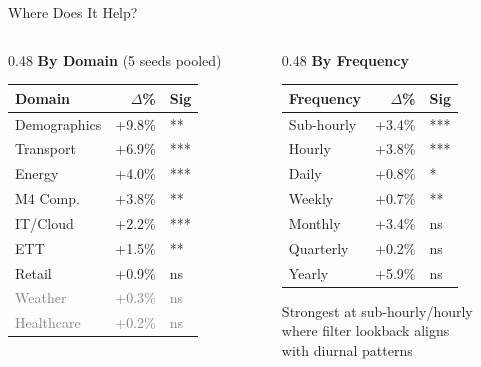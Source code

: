\documentclass[aspectratio=169,11pt]{beamer}
\begin{document}
\begin{frame}{Where Does It Help?}

\begin{columns}
\begin{column}{0.48\textwidth}
\centering
\textbf{By Domain} {\footnotesize(5 seeds pooled)}\\[0.3em]
\footnotesize
\begin{tabular}{lrl}
\toprule
Domain & $\Delta$\% & Sig \\
\midrule
Demographics & +9.8\% & ** \\
Transport & +6.9\% & *** \\
Energy & +4.0\% & *** \\
M4 Comp. & +3.8\% & ** \\
IT/Cloud & +2.2\% & *** \\
ETT & +1.5\% & ** \\
Retail & +0.9\% & ns \\
\textcolor{gray}{Weather} & \textcolor{gray}{+0.3\%} & \textcolor{gray}{ns} \\
\textcolor{gray}{Healthcare} & \textcolor{gray}{+0.2\%} & \textcolor{gray}{ns} \\
\bottomrule
\end{tabular}
\end{column}
\begin{column}{0.48\textwidth}
\centering
\textbf{By Frequency}\\[0.3em]
\footnotesize
\begin{tabular}{lrl}
\toprule
Frequency & $\Delta$\% & Sig \\
\midrule
Sub-hourly & +3.4\% & *** \\
Hourly & +3.8\% & *** \\
Daily & +0.8\% & * \\
Weekly & +0.7\% & ** \\
Monthly & +3.4\% & ns \\
Quarterly & +0.2\% & ns \\
Yearly & +5.9\% & ns \\
\bottomrule
\end{tabular}

\bigskip

{\footnotesize Strongest at sub-hourly/hourly\\where filter lookback aligns\\with diurnal patterns}
\end{column}
\end{columns}

\end{frame}
\end{document}
